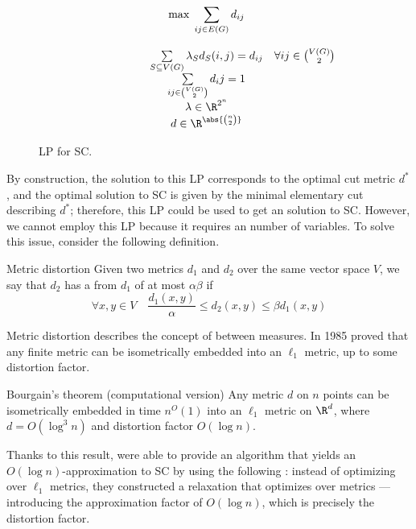 \documentclass[a4paper, 12pt]{report}
\begin{document}
    \begin{figure}[H]
        \centering
        \[\begin{array}{ccl}
            \qquad\qquad\quad
            & \max \; \displaystyle \sum_{ij \in E(G)}{d_{ij}} \\\\
            & \sum\limits_{S \subseteq V(G)}{\lambda_Sd_S(i, j)}  = d_{ij} & \forall ij \in \binom{V(G)}{2} \\
            & \sum\limits_{ij \in \binom{V(G)}{2}}{d_ij} = 1 \\
            & \lambda \in \R^{2^n} \\
            & d \in \R^{\abs{\binom{n}{2}}} \\
        \end{array}\]
        \caption{LP for SC.}
    \end{figure}

    By construction, the solution to this LP corresponds to the optimal cut metric $d^*$, and the optimal solution to SC is given by the minimal elementary cut describing $d^*$; therefore, this LP could be used to get an  solution to SC. However, we cannot employ this LP because it requires an  number of variables. To solve this issue, consider the following definition.

    \begin{frameddefn}{Metric distortion}
        Given two metrics $d_1$ and $d_2$ over the same vector space $V$, we say that $d_2$ has a  from $d_1$ of at most $\alpha \beta$ if $$\forall x, y \in V \quad \dfrac{d_1(x, y)}{\alpha} \le d_2(x, y) \le \beta d_1(x, y)$$
    \end{frameddefn}

    Metric distortion describes the concept of  between measures. In 1985 \textcite{bourgain} proved that any finite metric can be isometrically embedded into an $\ell_1$ metric, up to some distortion factor.

    \begin{framedthm}[label={bourgain}]{Bourgain's theorem (computational version)}
        Any metric $d$ on $n$ points can be isometrically embedded in time $n^O(1)$ into an $\ell_1$ metric on $\R^d$, where $d = O(\log^3 n)$ and distortion factor $O(\log n)$.
    \end{framedthm}

    Thanks to this result, \textcite{leightonrao} were able to provide an algorithm that yields an $O(\log n)$-approximation to SC by using the following : instead of optimizing over $\ell_1$ metrics, they constructed a relaxation that optimizes over  metrics --- introducing the approximation factor of $O(\log n)$, which is precisely the distortion factor.
\end{document}
